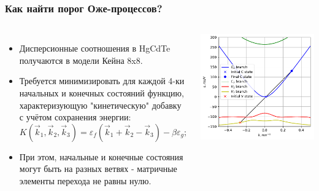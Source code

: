 \documentclass[9pt,pdf]{beamer}
\begin{document}
  \begin{frame}
    \frametitle{Как найти порог Оже-процессов?}
    \begin{columns}
        \begin{itemize}
            \item Дисперсионные соотношения в HgCdTe получаются 
              в модели Кейна 8x8.
            \item Требуется минимизировать для каждой 4-ки начальных и конечных состояний 
              функцию, характеризующую "кинетическую" добавку с учётом 
              сохранения энергии:
              \begin{equation*}
                K(\vec{k}_{1}, \vec{k}_{2}, \vec{k}_{3}) = 
                \varepsilon_{f}(\vec{k}_{1} + \vec{k}_{2} - \vec{k}_{3}) - \beta \varepsilon_g;
              \end{equation*}

              \item При этом, начальные и конечные состояния могут быть на разных 
                ветвях - матричные элементы перехода не равны нулю.
        \end{itemize}
        
        \begin{center}
          \includegraphics[width=\textwidth]{./images/add_pic.pdf}
        \end{center}
    \end{columns}
  \end{frame}
\end{document}
